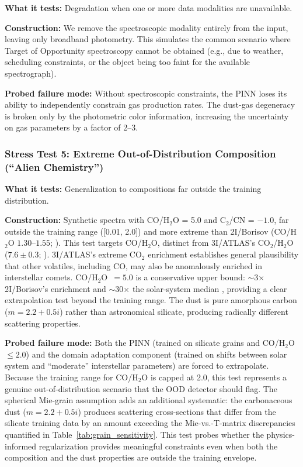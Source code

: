 \documentclass[usenatbib]{mnras}
\begin{document}
\textbf{What it tests:} Degradation when one or more data modalities are unavailable.

\textbf{Construction:} We remove the spectroscopic modality entirely from the input, leaving only broadband photometry. This simulates the common scenario where Target of Opportunity spectroscopy cannot be obtained (e.g., due to weather, scheduling constraints, or the object being too faint for the available spectrograph).

\textbf{Probed failure mode:} Without spectroscopic constraints, the PINN loses its ability to independently constrain gas production rates. The dust-gas degeneracy is broken only by the photometric color information, increasing the uncertainty on gas parameters by a factor of 2--3.

\subsubsection{Stress Test 5: Extreme Out-of-Distribution Composition (``Alien Chemistry'')}

\textbf{What it tests:} Generalization to compositions far outside the training distribution.

\textbf{Construction:} Synthetic spectra with CO/H$_2$O = 5.0 and C$_2$/CN = $-1.0$, far outside the training range ([0.01, 2.0]) and more extreme than 2I/Borisov (CO/H$_2$O $1.30$--$1.55$; \citealt{bodewits20}). This test targets CO/H$_2$O, distinct from 3I/ATLAS's CO$_2$/H$_2$O ($7.6 \pm 0.3$; \citealt{cordiner25}). 3I/ATLAS's extreme CO$_2$ enrichment establishes general plausibility that other volatiles, including CO, may also be anomalously enriched in interstellar comets. CO/H$_2$O~$=5.0$ is a conservative upper bound: $\sim$3$\times$ 2I/Borisov's enrichment and $\sim$30$\times$ the solar-system median \citep{bockelee04}, providing a clear extrapolation test beyond the training range. The dust is pure amorphous carbon ($m = 2.2 + 0.5i$) rather than astronomical silicate, producing radically different scattering properties.

\textbf{Probed failure mode:} Both the PINN (trained on silicate grains and CO/H$_2$O $\leq 2.0$) and the domain adaptation component (trained on shifts between solar system and ``moderate'' interstellar parameters) are forced to extrapolate. Because the training range for CO/H$_2$O is capped at 2.0, this test represents a genuine out-of-distribution scenario that the OOD detector should flag. The spherical Mie-grain assumption adds an additional systematic: the carbonaceous dust ($m = 2.2 + 0.5i$) produces scattering cross-sections that differ from the silicate training data by an amount exceeding the Mie-vs.-T-matrix discrepancies quantified in Table~\ref{tab:grain_sensitivity}. This test probes whether the physics-informed regularization provides meaningful constraints even when both the composition and the dust properties are outside the training envelope.
\end{document}
